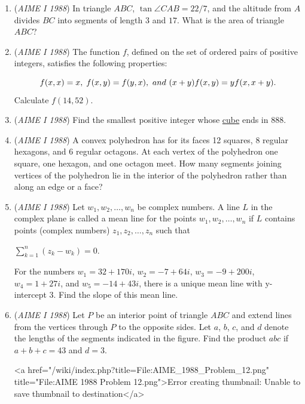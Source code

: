 \begin{enumerate}
	\item (\textit{AIME I 1988}) In triangle $ABC$, $\tan \angle CAB = 22/7$, and the altitude from $A$ divides $BC$ into segments of length $3$ and $17$. What is the area of triangle $ABC$?


 

	\item (\textit{AIME I 1988}) The function $f$, defined on the set of ordered pairs of positive integers, satisfies the following properties:

 \[f(x, x) = x,\; f(x, y) = f(y, x), {\textrm \ and\ } (x+y)f(x, y) = yf(x, x+y).\]
Calculate $f(14,52)$.


 

	\item (\textit{AIME I 1988}) Find the smallest positive integer whose \href{https://artofproblemsolving.com/wiki/index.php?title=Perfect\_cube}{cube} ends in $888$.


 

	\item (\textit{AIME I 1988}) A convex polyhedron has for its faces 12 squares, 8 regular hexagons, and 6 regular octagons. At each vertex of the polyhedron one square, one hexagon, and one octagon meet. How many segments joining vertices of the polyhedron lie in the interior of the polyhedron rather than along an edge or a face?


 

	\item (\textit{AIME I 1988}) Let $w_1, w_2, \dots, w_n$ be complex numbers. A line $L$ in the complex plane is called a mean line for the points $w_1, w_2, \dots, w_n$ if $L$ contains points (complex numbers) $z_1, z_2, \dots, z_n$ such that


 $\sum_{k = 1}^n (z_k - w_k) = 0.$

 For the numbers $w_1 = 32 + 170i$, $w_2 = -7 + 64i$, $w_3 = -9 +200i$, $w_4 = 1 + 27i$, and $w_5 = -14 + 43i$, there is a unique mean line with y-intercept $3$. Find the slope of this mean line.


 

	\item (\textit{AIME I 1988}) Let $P$ be an interior point of triangle $ABC$ and extend lines from the vertices through $P$ to the opposite sides. Let $a$, $b$, $c$, and $d$ denote the lengths of the segments indicated in the figure. Find the product $abc$ if $a + b + c = 43$ and $d = 3$. 


 <a href="/wiki/index.php?title=File:AIME\_1988\_Problem\_12.png" title="File:AIME 1988 Problem 12.png">Error creating thumbnail: Unable to save thumbnail to destination</a>



\end{enumerate}
